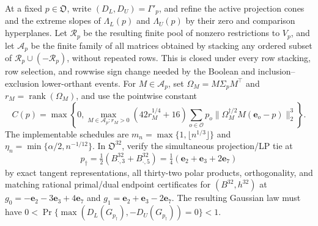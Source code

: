 At a fixed \(p\in\mathfrak O\), write \((D_L,D_U)=\Gamma'_p\), and refine the active projection cones and the extreme slopes of \(\Lambda_L(p)\) and \(\Lambda_U(p)\) by their zero and comparison hyperplanes.  Let \(\mathcal R_p\) be the resulting finite pool of nonzero restrictions to \(V_p\), and let \(\mathcal A_p\) be the finite family of all matrices obtained by stacking any ordered subset of \(\mathcal R_p\cup(-\mathcal R_p)\), without repeated rows.  This is closed under every row stacking, row selection, and rowwise sign change needed by the Boolean and inclusion--exclusion lower-orthant events.  For \(M\in\mathcal A_p\), set \(\Omega_M=M\Sigma_pM^{\top}\) and \(r_M=\operatorname{rank}(\Omega_M)\), and use the pointwise constant
\[
C(p)=\max\left\{0,\max_{M\in\mathcal A_p:r_M>0}(42r_M^{1/4}+16)
\sum_{o\in\mathcal O}p_o\|\Omega_M^{\dagger/2}M(\mathbf e_o-p)\|_2^3\right\}.
\]
The implementable schedules are \(m_n=\max\{1,\lfloor n^{1/3}\rfloor\}\) and \(\eta_n=\min\{\alpha/2,n^{-1/12}\}\).  In \(\mathfrak O^{32}\), verify the simultaneous projection/LP tie at
\[
p_\dagger=\tfrac12(B^{32}_{\cdot,3}+B^{32}_{\cdot,5})
=\tfrac14(\mathbf e_2+\mathbf e_3+2\mathbf e_7)
\]
by exact tangent representations, all thirty-two polar products, orthogonality, and matching rational primal/dual endpoint certificates for \((B^{32},h^{32})\) at \(g_0=-\mathbf e_2-3\mathbf e_3+4\mathbf e_7\) and \(g_1=\mathbf e_2+\mathbf e_3-2\mathbf e_7\).  The resulting Gaussian law must have \(0<\Pr\{\max(D_L(G_{p_\dagger}),-D_U(G_{p_\dagger}))=0\}<1\).